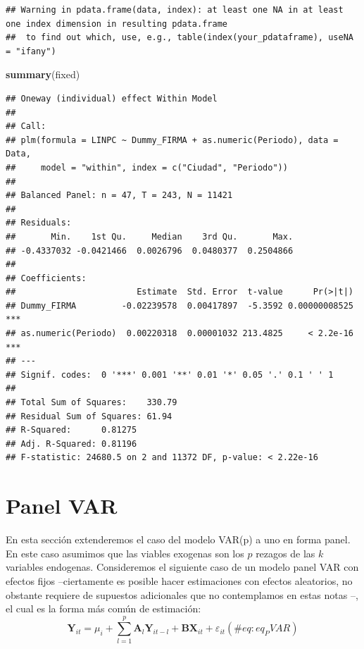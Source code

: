 \documentclass[
]{book}
\newenvironment{Shaded}{\begin{snugshade}}{\end{snugshade}}
\newcommand{\FunctionTok}[1]{\textcolor[rgb]{0.13,0.29,0.53}{\textbf{#1}}}
\newcommand{\NormalTok}[1]{#1}
\begin{document}
\begin{verbatim}
## Warning in pdata.frame(data, index): at least one NA in at least one index dimension in resulting pdata.frame
##  to find out which, use, e.g., table(index(your_pdataframe), useNA = "ifany")
\end{verbatim}

\begin{Shaded}
\begin{Highlighting}[]
\FunctionTok{summary}\NormalTok{(fixed)}
\end{Highlighting}
\end{Shaded}

\begin{verbatim}
## Oneway (individual) effect Within Model
## 
## Call:
## plm(formula = LINPC ~ Dummy_FIRMA + as.numeric(Periodo), data = Data, 
##     model = "within", index = c("Ciudad", "Periodo"))
## 
## Balanced Panel: n = 47, T = 243, N = 11421
## 
## Residuals:
##       Min.    1st Qu.     Median    3rd Qu.       Max. 
## -0.4337032 -0.0421466  0.0026796  0.0480377  0.2504866 
## 
## Coefficients:
##                        Estimate  Std. Error  t-value      Pr(>|t|)    
## Dummy_FIRMA         -0.02239578  0.00417897  -5.3592 0.00000008525 ***
## as.numeric(Periodo)  0.00220318  0.00001032 213.4825     < 2.2e-16 ***
## ---
## Signif. codes:  0 '***' 0.001 '**' 0.01 '*' 0.05 '.' 0.1 ' ' 1
## 
## Total Sum of Squares:    330.79
## Residual Sum of Squares: 61.94
## R-Squared:      0.81275
## Adj. R-Squared: 0.81196
## F-statistic: 24680.5 on 2 and 11372 DF, p-value: < 2.22e-16
\end{verbatim}

\hypertarget{panel-var}{%
\section{Panel VAR}\label{panel-var}}

En esta sección extenderemos el caso del modelo VAR(p) a uno en forma panel. En este caso asumimos que las viables exogenas son los \(p\) rezagos de las \(k\) variables endogenas. Consideremos el siguiente caso de un modelo panel VAR con efectos fijos --ciertamente es posible hacer estimaciones con efectos aleatorios, no obstante requiere de supuestos adicionales que no contemplamos en estas notas --, el cual es la forma más común de estimación:
\begin{equation}
    \mathbf{Y}_{it} = \mu_i + \sum_{l = 1}^p \mathbf{A}_l \mathbf{Y}_{i t - l} + \mathbf{B} \mathbf{X}_{it} + \varepsilon_{it}
   (\#eq:eq_PVAR)
\end{equation}
\end{document}
